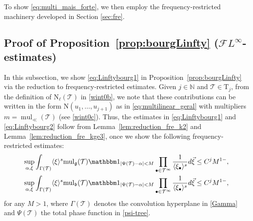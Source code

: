 \documentclass[%
11pt,  reqno]{amsart}
\newcommand{\jap}[1]{\langle #1 \rangle}
\newcommand{\5}{\textup{V}}
\newcommand{\FL}{\mathcal{F} L}
\newcommand{\ind}{\mathbbm 1}
\newcommand{\wt}{\widetilde}
\theoremstyle{remark}
\newcommand{\bul}{\bullet}
\newcommand{\TT}{\mathcal{T}}
\newcommand{\Tr}{\mathrm{T}}
\newcommand{\al}{\alpha}
\newcommand{\G}{\Gamma}
\newcommand{\bfrak}{\mathfrak{b}}
\newcommand{\gfrak}{\mathfrak{g}}
\newcommand{\ta}{\theta}
\renewcommand{\l}{\ell}
\newcommand{\N}{\mathbb{N}}
\DeclareMathOperator{\mul}{mul}
\numberwithin{equation}{section}
\numberwithin{theorem}{section}
\newcommand{\NN}{\mathrm{N}}
\begin{document}

To show \eqref{eq:multi_mais_forte}, we then employ the frequency-restricted machinery developed in Section \ref{sec:fre}.
%





\subsection{Proof of Proposition~\ref{prop:bourgLinfty} ($\FL^\infty$-estimates)}
\label{SUB:Linfty}



In this subsection, we show \eqref{eq:Linftybourg1} in Proposition~\ref{prop:bourgLinfty} via the reduction to frequency-restricted estimates. 
Given $j\in\N$ and $\TT\in \Tr_j$, from the definition of $\NN_\l(\TT)$  in \eqref{wint0b}, we note that these contributions can be written in the form $\NN(u_1, \ldots, u_{j+1})$ as 
in \eqref{eq:multilinear_geral}
with multipliers $m = \mul_\ll(\TT)$ (see \eqref{wint0c}). Thus, the estimates in \eqref{eq:Linftybourg1} and \eqref{eq:Linftybourg2} follow from Lemma~\ref{lem:reduction_fre_k2} and Lemma~\ref{lem:reduction_fre_kge3}, 
once we show the following frequency-restricted estimates:
\begin{align}
\label{eq:fre_geral}
	\sup_{\alpha, \xi} \int_{\G(\TT)} \jap{\xi}^s  {\mul}_\gfrak(\TT)  \ind_{|\Psi(\TT) - \al| < M} \prod_{\bul\in \TT^\infty} \frac{1}{\jap{\xi_\bul}^s} d\vec\xi 
&
\le 
C^j M^{1-}, 
\\
\label{eq:fre_geral2}
\sup_{\alpha, \xi} \int_{\G(\TT)} \jap{\xi}^s  {\mul}_\bfrak(\TT) 
 \ind_{|\Psi(\TT) - \al| < M} \prod_{\bul\in \TT^\infty} \frac{1}{\jap{\xi_\bul}^s} d\vec\xi 
&
\le 
C^j M^{1-}, 
\end{align}
for any $M>1$, 
where $\G(\TT)$ denotes the convolution hyperplane in \eqref{Gamma} and
$\Psi(\TT)$ the total phase function in \eqref{psi-tree}.
\end{document}
